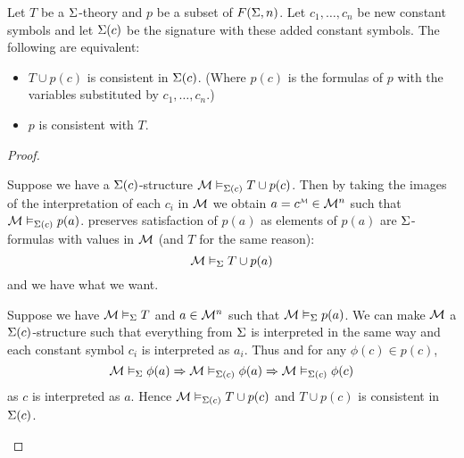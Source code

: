 \begin{lem}
    Let $T$ be a $\Sigma$-theory and $p$ be a subset of $F(\Sigma,n)$.
    Let $c_1,\dots,c_n$ be new constant symbols and let $\Sigma(c)$ be 
    the signature with these added constant symbols.
    The following are equivalent:
    \begin{itemize}
        \item $T \cup p(c)$ is consistent in $\Sigma(c)$.
            (Where $p(c)$ is the formulas of $p$ with the variables substituted 
            by $c_1,\dots,c_n$.)
        \item $p$ is consistent with $T$.
    \end{itemize}
\end{lem}
\begin{proof}
    \begin{forward}
        Suppose we have a $\Sigma(c)$-structure 
        $\mathcal{M} \vDash_{\Sigma(c)} T \cup p(c)$.
        Then by taking the images of the interpretation of each $c_i$ in $\mathcal{M}$
        we obtain $a = \modintp{\MM}{c} \in {\MM}^n$ such that 
        $\mathcal{M} \vDash_{\Sigma(c)} p(a)$.
         preserves 
        satisfaction of $p(a)$  as elements of $p(a)$ are $\Sigma$-formulas
        with values in $\mathcal{M}$ (and $T$ for the same reason):
        \[\mathcal{M} \vDash_{\Sigma} T \cup p(a)\]
        and we have what we want.
    \end{forward}

    \begin{backward}
        Suppose we have $\mathcal{M} \vDash_{\Sigma} T$ and $a \in {\mathcal{M}}^n$
        such that $\mathcal{M} \vDash_{\Sigma} p(a)$.
        We can make $\mathcal{M}$ a $\Sigma(c)$-structure such that 
        everything from $\Sigma$ is interpreted in the same way 
        and each constant symbol $c_i$ is interpreted as $a_i$.
        Thus  and for any 
        $\phi(c) \in p(c)$,
        \[\mathcal{M} \vDash_{\Sigma} \phi(a) \Rightarrow \mathcal{M} \vDash_{\Sigma(c)} \phi(a)
        \Rightarrow \mathcal{M} \vDash_{\Sigma(c)} \phi(c)\]
        as $c$ is interpreted as $a$.
        Hence $\mathcal{M} \vDash_{\Sigma(c)} T \cup p(c)$ 
        and $T \cup p(c)$ is consistent in $\Sigma(c)$.
    \end{backward}
\end{proof}

